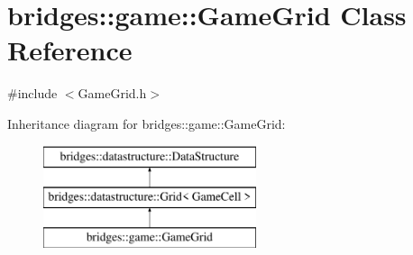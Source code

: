 \hypertarget{classbridges_1_1game_1_1_game_grid}{}\section{bridges\+:\+:game\+:\+:Game\+Grid Class Reference}
\label{classbridges_1_1game_1_1_game_grid}


{\ttfamily \#include $<$Game\+Grid.\+h$>$}

Inheritance diagram for bridges\+:\+:game\+:\+:Game\+Grid\+:\begin{figure}[H]
\begin{center}
\leavevmode
\includegraphics[height=3.000000cm]{classbridges_1_1game_1_1_game_grid}
\end{center}
\end{figure}
